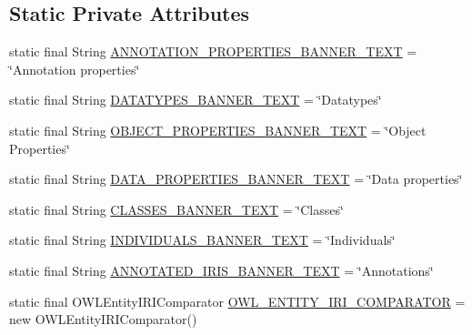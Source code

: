 \subsection*{Static Private Attributes}
\begin{DoxyCompactItemize}
\item 
static final String \hyperlink{classorg_1_1coode_1_1owlapi_1_1rdf_1_1renderer_1_1_r_d_f_renderer_base_a471973a93034980a593d11b668dc9393}{A\-N\-N\-O\-T\-A\-T\-I\-O\-N\-\_\-\-P\-R\-O\-P\-E\-R\-T\-I\-E\-S\-\_\-\-B\-A\-N\-N\-E\-R\-\_\-\-T\-E\-X\-T} = \char`\"{}Annotation properties\char`\"{}
\item 
static final String \hyperlink{classorg_1_1coode_1_1owlapi_1_1rdf_1_1renderer_1_1_r_d_f_renderer_base_a9d5584d93bcddad75c7857c5387fca2d}{D\-A\-T\-A\-T\-Y\-P\-E\-S\-\_\-\-B\-A\-N\-N\-E\-R\-\_\-\-T\-E\-X\-T} = \char`\"{}Datatypes\char`\"{}
\item 
static final String \hyperlink{classorg_1_1coode_1_1owlapi_1_1rdf_1_1renderer_1_1_r_d_f_renderer_base_a6f91b51f7eda50aba5cb1628aa766f36}{O\-B\-J\-E\-C\-T\-\_\-\-P\-R\-O\-P\-E\-R\-T\-I\-E\-S\-\_\-\-B\-A\-N\-N\-E\-R\-\_\-\-T\-E\-X\-T} = \char`\"{}Object Properties\char`\"{}
\item 
static final String \hyperlink{classorg_1_1coode_1_1owlapi_1_1rdf_1_1renderer_1_1_r_d_f_renderer_base_ac5d2f8313609ab1b0c62067339878a63}{D\-A\-T\-A\-\_\-\-P\-R\-O\-P\-E\-R\-T\-I\-E\-S\-\_\-\-B\-A\-N\-N\-E\-R\-\_\-\-T\-E\-X\-T} = \char`\"{}Data properties\char`\"{}
\item 
static final String \hyperlink{classorg_1_1coode_1_1owlapi_1_1rdf_1_1renderer_1_1_r_d_f_renderer_base_a08bd7a680414ea327dfc52f1b6c8117e}{C\-L\-A\-S\-S\-E\-S\-\_\-\-B\-A\-N\-N\-E\-R\-\_\-\-T\-E\-X\-T} = \char`\"{}Classes\char`\"{}
\item 
static final String \hyperlink{classorg_1_1coode_1_1owlapi_1_1rdf_1_1renderer_1_1_r_d_f_renderer_base_aec478e68052eb952d8a77f036a1acbd6}{I\-N\-D\-I\-V\-I\-D\-U\-A\-L\-S\-\_\-\-B\-A\-N\-N\-E\-R\-\_\-\-T\-E\-X\-T} = \char`\"{}Individuals\char`\"{}
\item 
static final String \hyperlink{classorg_1_1coode_1_1owlapi_1_1rdf_1_1renderer_1_1_r_d_f_renderer_base_aa0aa5667e3f897e2832c5a0c359a9197}{A\-N\-N\-O\-T\-A\-T\-E\-D\-\_\-\-I\-R\-I\-S\-\_\-\-B\-A\-N\-N\-E\-R\-\_\-\-T\-E\-X\-T} = \char`\"{}Annotations\char`\"{}
\item 
static final O\-W\-L\-Entity\-I\-R\-I\-Comparator \hyperlink{classorg_1_1coode_1_1owlapi_1_1rdf_1_1renderer_1_1_r_d_f_renderer_base_a7219d3671a80cf2b6111134fb8284d9d}{O\-W\-L\-\_\-\-E\-N\-T\-I\-T\-Y\-\_\-\-I\-R\-I\-\_\-\-C\-O\-M\-P\-A\-R\-A\-T\-O\-R} = new O\-W\-L\-Entity\-I\-R\-I\-Comparator()
\end{DoxyCompactItemize}


